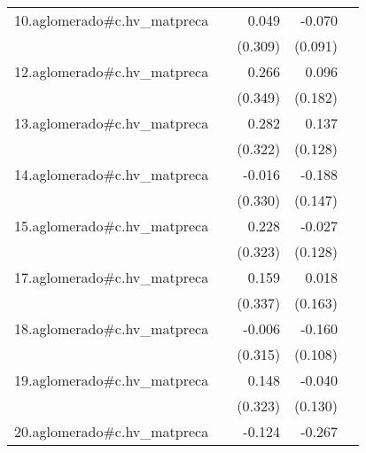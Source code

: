 {\begin{longtable}{l*{4}{D{.}{.}{-1}}}
\addlinespace
10.aglomerado#c.hv\_matpreca&                     &       0.049         &      -0.070         &                     \\
            &                     &     (0.309)         &     (0.091)         &                     \\
\addlinespace
12.aglomerado#c.hv\_matpreca&                     &       0.266         &       0.096         &                     \\
            &                     &     (0.349)         &     (0.182)         &                     \\
\addlinespace
13.aglomerado#c.hv\_matpreca&                     &       0.282         &       0.137         &                     \\
            &                     &     (0.322)         &     (0.128)         &                     \\
\addlinespace
14.aglomerado#c.hv\_matpreca&                     &      -0.016         &      -0.188         &                     \\
            &                     &     (0.330)         &     (0.147)         &                     \\
\addlinespace
15.aglomerado#c.hv\_matpreca&                     &       0.228         &      -0.027         &                     \\
            &                     &     (0.323)         &     (0.128)         &                     \\
\addlinespace
17.aglomerado#c.hv\_matpreca&                     &       0.159         &       0.018         &                     \\
            &                     &     (0.337)         &     (0.163)         &                     \\
\addlinespace
18.aglomerado#c.hv\_matpreca&                     &      -0.006         &      -0.160         &                     \\
            &                     &     (0.315)         &     (0.108)         &                     \\
\addlinespace
19.aglomerado#c.hv\_matpreca&                     &       0.148         &      -0.040         &                     \\
            &                     &     (0.323)         &     (0.130)         &                     \\
\addlinespace
20.aglomerado#c.hv\_matpreca&                     &      -0.124         &      -0.267\sym{*}  &                     \\

\end{longtable}}
